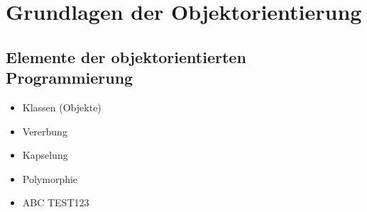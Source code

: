 \section{Grundlagen der Objektorientierung}

\subsection{Elemente der objektorientierten Programmierung}
\begin{itemize}
    \item Klassen (Objekte)
    \item Vererbung
    \item Kapselung
    \item Polymorphie
    \item ABC TEST123
\end{itemize}